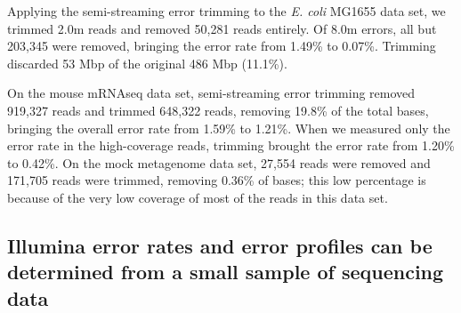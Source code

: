 \documentclass{article}
\begin{document}


%

Applying the semi-streaming error trimming to the {\em E. coli} MG1655 data
set, we trimmed 2.0m reads and removed 50,281
reads entirely.  Of 8.0m errors, all but 203,345 were removed,
bringing the error rate from 1.49\% to 0.07\%.  Trimming discarded 53
Mbp of the original 486 Mbp (11.1\%).



On the mouse mRNAseq data set, semi-streaming error trimming removed 919,327
reads and trimmed 648,322 reads, removing 19.8\% of the total bases,
bringing the overall error rate from 1.59\% to 1.21\%.  When we measured
only the error rate in the high-coverage reads, trimming brought the
error rate from 1.20\% to 0.42\%.  On the mock metagenome data set,
27,554 reads were removed and 171,705 reads were trimmed, removing 0.36\%
of bases; this low percentage is because of the very low coverage of
most of the reads in this data set.

\subsection{Illumina error rates and error profiles can be determined from a
small sample of sequencing data}
\end{document}
